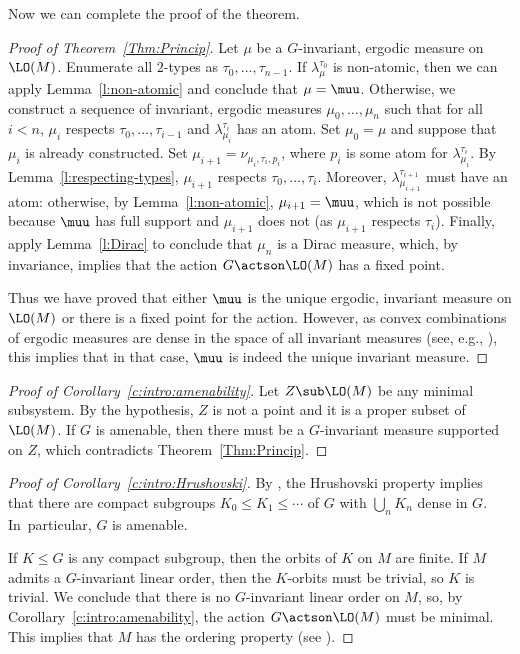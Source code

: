 Now we can complete the proof of the theorem.
\begin{proof}[Proof of Theorem~\ref{Thm:Princip}]
Let $\mu$ be a $G$-invariant, ergodic measure on $\LO(M)$. Enumerate all $2$-types as $\tau_0, \ldots, \tau_{n-1}$. If $\lambda^{\tau_0}_\mu$ is non-atomic, then we can apply Lemma~\ref{l:non-atomic} and conclude that $\mu = \muu$. Otherwise, we construct a sequence of invariant, ergodic measures $\mu_0, \ldots, \mu_n$ such that for all $i < n$, $\mu_i$ respects $\tau_0, \ldots, \tau_{i-1}$ and $\lambda^{\tau_i}_{\mu_i}$ has an atom. Set $\mu_0 = \mu$ and suppose that $\mu_i$ is already constructed. Set $\mu_{i+1} = \nu_{\mu_i, \tau_i, p_i}$, where $p_i$ is some atom for $\lambda_{\mu_i}^{\tau_i}$. By Lemma~\ref{l:respecting-types}, $\mu_{i+1}$ respects $\tau_0, \ldots, \tau_i$. Moreover, $\lambda_{\mu_{i+1}}^{\tau_{i+1}}$ must have an atom: otherwise, by Lemma~\ref{l:non-atomic}, $\mu_{i+1} = \muu$, which is not possible because $\muu$ has full support and $\mu_{i+1}$ does not (as $\mu_{i+1}$ respects $\tau_i$). Finally, apply Lemma~\ref{l:Dirac} to conclude that $\mu_n$ is a Dirac measure, which, by invariance, implies that the action $G \actson \LO(M)$ has a fixed point.

Thus we have proved that either $\muu$ is the unique ergodic, invariant measure on $\LO(M)$ or there is a fixed point for the action. However, as convex combinations of ergodic measures are dense in the space of all invariant measures (see, e.g., \cite[\S12]{Phelps2001}), this implies that in that case, $\muu$ is indeed the unique invariant measure.
\end{proof}

\begin{proof}[Proof of Corollary~\ref{c:intro:amenability}]
Let $Z \sub \LO(M)$ be any minimal subsystem. By the hypothesis, $Z$ is not a point and it is a proper subset of $\LO(M)$. If $G$ is amenable, then there must be a $G$-invariant measure supported on $Z$, which contradicts Theorem~\ref{Thm:Princip}.
\end{proof}

\begin{proof}[Proof of Corollary~\ref{c:intro:Hrushovski}]
By \cite[Prop.\,6.4]{Kechris2007a}, the Hrushovski property implies that there are compact subgroups $K_0 \leq K_1 \leq \cdots$ of $G$ with $\bigcup_n K_n$ dense in $G$. In~par\-tic\-ular, $G$ is amenable.

If $K \leq G$ is any compact subgroup, then the orbits of $K$ on $M$ are finite. If $M$ admits a $G$-invariant linear order, then the $K$-orbits must be trivial, so $K$ is trivial. We conclude that there is no $G$-invariant linear order on $M$, so, by Corollary~\ref{c:intro:amenability}, the action $G \actson \LO(M)$ must be minimal. This implies that $M$ has the ordering property (see \cite[Th.\,4]{NguyenVanThe2013}).
\end{proof}

